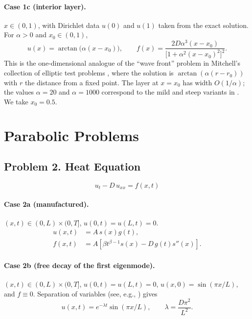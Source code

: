 \documentclass[11pt]{article}
\begin{document}
\paragraph{Case 1c (interior layer).}
$x\in(0,1)$, with Dirichlet data $u(0)$ and $u(1)$ taken from the exact
solution. For $\alpha>0$ and $x_0\in(0,1)$,
\[
u(x)=\arctan\bigl(\alpha(x-x_0)\bigr),
\qquad
f(x)=\frac{2D\alpha^3(x-x_0)}{\bigl[1+\alpha^2(x-x_0)^2\bigr]^2}.
\]
This is the one-dimensional analogue of the ``wave front'' problem in
Mitchell's collection of elliptic test problems \cite{Mit13}, where the
solution is $\arctan(\alpha(r-r_0))$ with $r$ the distance from a fixed
point. The layer at $x=x_0$ has width $O(1/\alpha)$; the values
$\alpha=20$ and $\alpha=1000$ correspond to the mild and steep variants
in \cite{Mit13}. We take $x_0=0.5$.

\section{Parabolic Problems}

\subsection*{Problem 2. Heat Equation}

\[
\boxed{u_t-D\,u_{xx}=f(x,t)}
\]

\paragraph{Case 2a (manufactured).}
$(x,t)\in(0,L)\times(0,T]$, $u(0,t)=u(L,t)=0$.
\[
\begin{aligned}
u(x,t)&=A\,s(x)g(t),\\
f(x,t)&=A\left[
\beta t^{\beta-1}s(x)-D\,g(t)s''(x)
\right].
\end{aligned}
\]

\paragraph{Case 2b (free decay of the first eigenmode).}
$(x,t)\in(0,L)\times(0,T]$, $u(0,t)=u(L,t)=0$,
$u(x,0)=\sin(\pi x/L)$, and $f\equiv0$. Separation of variables (see,
e.g., \cite[Ch.~4]{Str08}) gives
\[
u(x,t)=e^{-\lambda t}\sin(\pi x/L),
\qquad
\lambda=\frac{D\pi^2}{L^2}.
\]
\end{document}
